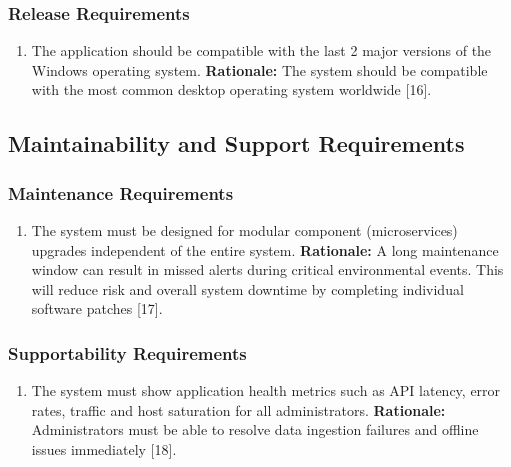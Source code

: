 \documentclass[]{article}
\begin{document}
\subsubsection{Release Requirements}
\label{ssub:release_requirements}
\begin{enumerate}[{OE-R}1. ]
	\item The application should be compatible with the last 2 major versions of the Windows operating system.\newline
	{\bf Rationale:} The system should be compatible with the most common desktop operating system worldwide [16].
\end{enumerate}


\subsection{Maintainability and Support Requirements}
\label{sub:maintainability_and_support_requirements}

\subsubsection{Maintenance Requirements}
\label{ssub:maintenance_requirements}
\begin{enumerate}[{MS-M}1. ]
	\item The system must be designed for modular component (microservices) upgrades independent of the entire system.\newline
	{\bf Rationale:} A long maintenance window can result in missed alerts during critical environmental events. This will reduce risk and overall system downtime by completing individual software patches [17].
\end{enumerate}

\subsubsection{Supportability Requirements}
\label{ssub:supportability_requirements}
\begin{enumerate}[{MS-S}1. ]
	\item The system must show application health metrics such as API latency, error rates, traffic and host saturation for all administrators.\newline
	{\bf Rationale:} Administrators must be able to resolve data ingestion failures and offline issues immediately [18].
\end{enumerate}
\end{document}
